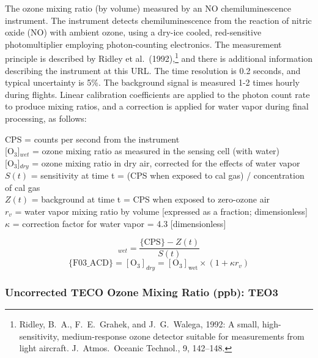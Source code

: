 \documentclass[
  english,
]{book}
\begin{document}
The ozone mixing ratio (by volume) measured by an NO chemiluminescence instrument. The instrument detects chemiluminescence from the reaction of nitric oxide (NO) with ambient ozone, using a dry-ice cooled, red-sensitive photomultiplier employing photon-counting electronics. The measurement principle is described by Ridley et al.~(1992),\footnote{Ridley, B.~A., F.~E.~Grahek, and J.~G.~Walega, 1992: A small, high-sensitivity, medium-response ozone detector suitable for measurements from light aircraft. J.~Atmos.~Oceanic Technol., 9, 142--148.}
and there is additional information describing the instrument at this URL. The time resolution is 0.2 seconds, and typical uncertainty is 5\%. The background signal is measured 1-2 times hourly during flights. Linear calibration coefficients are applied to the photon count rate to produce mixing ratios, and a correction is applied for water vapor during final processing, as follows:

CPS = counts per second from the instrument\\
{[}O\(_{3}\){]}\(_{wet}\) = ozone mixing ratio as measured in the sensing
cell (with water)\\
{[}O\(_{3}\){]}\(_{dry}\) = ozone mixing ratio in dry air, corrected
for the effects of water vapor\\
\(S(t)\) = sensitivity at time t = (CPS when exposed to cal gas)
/ concentration of cal gas\\
\(Z(t)\) = background at time t = CPS when exposed to zero-ozone
air\\
\(r_v\) = water vapor mixing ratio by volume
{[}expressed as a fraction; dimensionless{]}\\
\(\kappa\) = correction factor for water vapor = 4.3 {[}dimensionless{]}

\begin{equation}
[\mathrm{O}_{3}]_{wet}=\frac{\mathrm{\{CPS\}}-Z(t)}{S(t)}
\label{eq:O3box1}
\end{equation}
\begin{equation}
\mathrm{\{F03\_ACD\}}=[\mathrm{O_{3}}]_{dry} = \mathrm{[O_{3}]_{wet}}\times(1+\kappa r_{v})
\label{eq:O3box2}
\end{equation}

\hypertarget{te03}{%
\subsubsection*{Uncorrected TECO Ozone Mixing Ratio (ppb): TEO3}\label{te03}}
\end{document}
